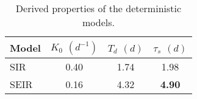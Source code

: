 \begin{table}[h]
\centering
\caption{Derived properties of the deterministic models.}
\label{tab:props}
\begin{tabular}{lccc}
\toprule
Model & $K_0$ $(d^{-1})$ & $T_d$ $(d)$ & $\tau_s$ $(d)$ \\
 \midrule
 SIR &               0.40 &              1.74 &      1.98  \\
 SEIR &              0.16 &              4.32 &      \textbf{4.90}  \\
\bottomrule
\end{tabular}
\end{table}
